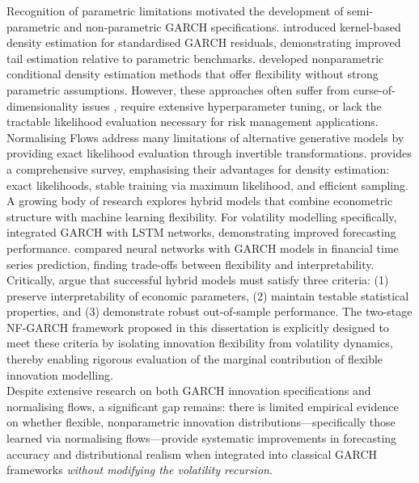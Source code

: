 \documentclass[oneside,12pt]{CUEDthesisPSnPDF}
\newcommand{\textcite}{\citet}
\newcommand{\parencite}{\citep}
\begin{document}
Recognition of parametric limitations motivated the development of semi-parametric and non-parametric GARCH specifications. \textcite{engle1993measuring} introduced kernel-based density estimation for standardised GARCH residuals, demonstrating improved tail estimation relative to parametric benchmarks. \textcite{hansen2004nonparametric} developed nonparametric conditional density estimation methods that offer flexibility without strong parametric assumptions. However, these approaches often suffer from curse-of-dimensionality issues \parencite{silverman1986density}, require extensive hyperparameter tuning, or lack the tractable likelihood evaluation necessary for risk management applications.\\

Normalising Flows \parencite{rezende2015variational, dinh2016density} address many limitations of alternative generative models by providing exact likelihood evaluation through invertible transformations. \textcite{papamakarios2021normalising} provides a comprehensive survey, emphasising their advantages for density estimation: exact likelihoods, stable training via maximum likelihood, and efficient sampling.\\

A growing body of research explores hybrid models that combine econometric structure with machine learning flexibility. For volatility modelling specifically, \textcite{kim2018forecasting} integrated GARCH with LSTM networks, demonstrating improved forecasting performance. \textcite{hossain2008comparison} compared neural networks with GARCH models in financial time series prediction, finding trade-offs between flexibility and interpretability. Critically, \textcite{harvey2022machine} argue that successful hybrid models must satisfy three criteria: (1) preserve interpretability of economic parameters, (2) maintain testable statistical properties, and (3) demonstrate robust out-of-sample performance. The two-stage NF-GARCH framework proposed in this dissertation is explicitly designed to meet these criteria by isolating innovation flexibility from volatility dynamics, thereby enabling rigorous evaluation of the marginal contribution of flexible innovation modelling.\\

Despite extensive research on both GARCH innovation specifications and normalising flows, a significant gap remains: there is limited empirical evidence on whether flexible, nonparametric innovation distributions—specifically those learned via normalising flows—provide systematic improvements in forecasting accuracy and distributional realism when integrated into classical GARCH frameworks \emph{without modifying the volatility recursion}.\\
\end{document}
